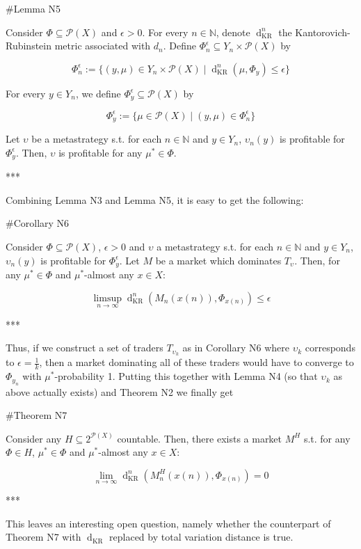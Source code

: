 \documentclass[a4paper]{article}
\newcommand{\Nats}{\mathbb{N}}
\newcommand{\Prob}{\mathcal{P}}
\newcommand{\Dkr}{\operatorname{d}_{\text{KR}}}
\begin{document}
\#Lemma N5

Consider ${\Phi \subseteq \Prob(X)}$ and ${\epsilon > 0}$. For every ${n \in \Nats}$, denote ${\Dkr^n}$ the Kantorovich-Rubinstein metric associated with ${d_n}$. Define ${\Phi_n^\epsilon \subseteq Y_n \times \Prob(X)}$ by 

$$\Phi_n^\epsilon:=\{(y,\mu) \in Y_n \times \Prob(X) \mid \Dkr^n(\mu,\Phi_y) \leq \epsilon\}$$

For every ${y \in Y_n}$, we define ${\Phi^\epsilon_y \subseteq \Prob(X)}$ by

$$\Phi^\epsilon_y:=\{\mu \in \Prob(X) \mid (y,\mu) \in \Phi^\epsilon_n\}$$

Let ${\upsilon}$ be a metastrategy s.t. for each ${n \in \Nats}$ and ${y \in Y_n}$, ${\upsilon_n(y)}$ is profitable for ${\Phi^\epsilon_y}$. Then, ${\upsilon}$ is profitable for any ${\mu^* \in \Phi}$.

***

Combining Lemma N3 and Lemma N5, it is easy to get the following:

\#Corollary N6

Consider ${\Phi \subseteq \Prob(X)}$, ${\epsilon > 0}$ and ${\upsilon}$ a metastrategy s.t. for each ${n \in \Nats}$ and ${y \in Y_n}$, ${\upsilon_n(y)}$ is profitable for ${\Phi^\epsilon_y}$. Let ${M}$ be a market which dominates ${T_\upsilon}$. Then, for any ${\mu^* \in \Phi}$ and ${\mu^*}$-almost any ${x \in X}$:

$$\limsup_{n \rightarrow \infty} \Dkr^n(M_n(x(n)),\Phi_{x(n)}) \leq \epsilon$$

***

Thus, if we construct a set of traders ${T_{\upsilon_k}}$ as in Corollary N6 where ${\upsilon_k}$ corresponds to ${\epsilon=\frac{1}{k}}$, then a market dominating all of these traders would have to converge to ${\Phi_{y_n}}$ with ${\mu^*}$-probability 1. Putting this together with Lemma N4 (so that ${\upsilon_k}$ as above actually exists) and Theorem N2 we finally get

\#Theorem N7

Consider any ${H \subseteq 2^{\Prob(X)}}$ countable. Then, there exists a market ${M^H}$ s.t. for any ${\Phi \in H}$, ${\mu^* \in \Phi}$ and ${\mu^*}$-almost any ${x \in X}$:

$$\lim_{n \rightarrow \infty} \Dkr^n(M^H_n(x(n)),\Phi_{x(n)}) = 0$$

***

This leaves an interesting open question, namely whether the counterpart of Theorem N7 with ${\Dkr}$ replaced by total variation distance is true.
\end{document}
